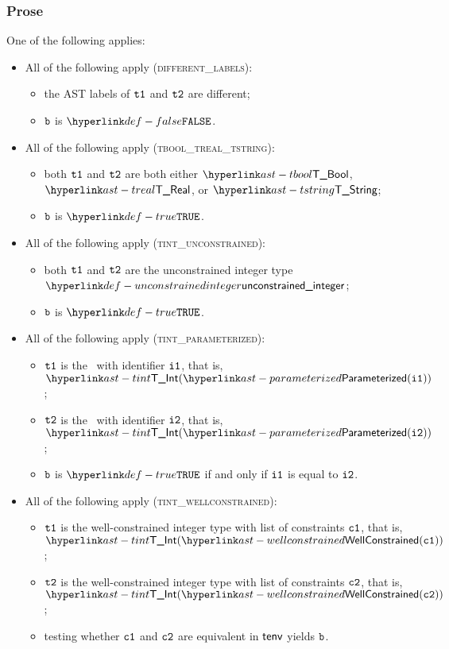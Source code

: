 \subsubsection{Prose}
One of the following applies:
\begin{itemize}
  \item All of the following apply (\textsc{different\_labels}):
  \begin{itemize}
    \item the AST labels of $\texttt{t1}$ and $\texttt{t2}$ are different;
    \item $\texttt{b}$ is $\False$.
  \end{itemize}

  \item All of the following apply (\textsc{tbool\_treal\_tstring}):
  \begin{itemize}
    \item both $\texttt{t1}$ and $\texttt{t2}$ are both either $\TBool$, $\TReal$, or $\TString$;
    \item $\texttt{b}$ is $\True$.
  \end{itemize}

  \item All of the following apply (\textsc{tint\_unconstrained}):
  \begin{itemize}
    \item both $\texttt{t1}$ and $\texttt{t2}$ are the unconstrained integer type $\unconstrainedinteger$;
    \item $\texttt{b}$ is $\True$.
  \end{itemize}

  \item All of the following apply (\textsc{tint\_parameterized}):
  \begin{itemize}
    \item $\texttt{t1}$ is the \parameterizedintegertype\  with identifier $\texttt{i1}$, that is, \\ $\TInt(\parameterized(\vione))$;
    \item $\texttt{t2}$ is the \parameterizedintegertype\ with identifier $\texttt{i2}$, that is, \\ $\TInt(\parameterized(\vitwo))$;
    \item $\texttt{b}$ is $\True$ if and only if $\texttt{i1}$ is equal to $\texttt{i2}$.
  \end{itemize}

  \item All of the following apply (\textsc{tint\_wellconstrained}):
  \begin{itemize}
    \item $\texttt{t1}$ is the well-constrained integer type with list of constraints $\texttt{c1}$, that is, \\ $\TInt(\wellconstrained(\vcone))$;
    \item $\texttt{t2}$ is the well-constrained integer type with list of constraints $\texttt{c2}$, that is, \\ $\TInt(\wellconstrained(\vctwo))$;
    \item testing whether $\texttt{c1}$ and $\texttt{c2}$ are equivalent in $\textsf{tenv}$ yields $\texttt{b}$\ProseOrTypeError.
  \end{itemize}


\end{itemize}
